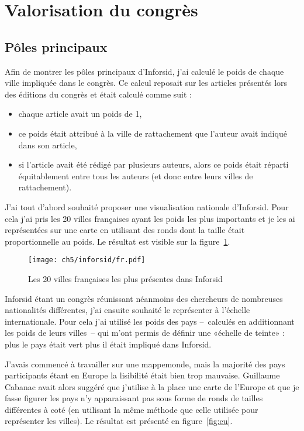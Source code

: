 	\section{Valorisation du congrès}
	
		\subsection{Pôles principaux}
			Afin de montrer les pôles principaux d\rq{}Inforsid, j\rq{}ai calculé le poids de chaque ville impliquée dans le congrès. Ce calcul reposait sur les articles présentés lors des éditions du congrès et était calculé comme suit :
			\begin{itemize}
				\item chaque article avait un poids de 1,
				\item ce poids était attribué à la ville de rattachement que l\rq{}auteur avait indiqué dans son article,
				\item si l\rq{}article avait été rédigé par plusieurs auteurs, alors ce poids était réparti équitablement entre tous les auteurs (et donc entre leurs villes de rattachement).
			\end{itemize}
		
			J\rq{}ai tout d\rq{}abord souhaité proposer une visualisation nationale d\rq{}Inforsid. Pour cela j\rq{}ai pris les 20 villes françaises ayant les poids les plus importants et je les ai représentées sur une carte en utilisant des ronds dont la taille était proportionnelle au poids. Le résultat est visible sur la figure~\ref{fig:fr}.
			
			\begin{figure}[h]
				\centering
				\texttt{[image: ch5/inforsid/fr.pdf]}
				\caption{Les 20 villes françaises les plus présentes dans Inforsid}\label{fig:fr}
			\end{figure}
		
			Inforsid étant un congrès réunissant néanmoins des chercheurs de nombreuses nationalités différentes, j\rq{}ai ensuite souhaité le représenter à l\rq{}échelle internationale. Pour cela j\rq{}ai utilisé les poids des pays --~calculés en additionnant les poids de leurs villes~-- qui m\rq{}ont permis de définir une «échelle de teinte» : plus le pays était vert plus il était impliqué dans Inforsid.
			
			J\rq{}avais commencé à travailler sur une mappemonde, mais la majorité des pays participants étant en Europe la lisibilité était bien trop mauvaise. Guillaume Cabanac avait alors suggéré que j\rq{}utilise à la place une carte de l\rq{}Europe et que je fasse figurer les pays n\rq{}y apparaissant pas sous forme de ronds de tailles différentes à coté (en utilisant la même méthode que celle utilisée pour représenter les villes). Le résultat est présenté en figure~\ref{fig:eu}.
			
